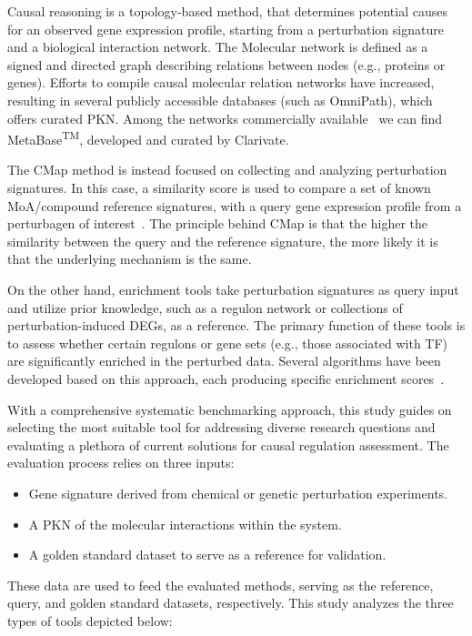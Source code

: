 Causal reasoning is a topology-based method, that determines potential causes for an observed gene expression profile, starting from a perturbation signature and a biological interaction network. 
The \gls{Molecular network} is defined as a signed and directed graph describing relations between nodes (e.g., proteins or genes). 
Efforts to compile causal molecular relation networks have increased, resulting in several publicly accessible databases (such as OmniPath), which offers curated \gls{PKN}. 
Among the networks commercially available~\cite{RN32} we can find MetaBase\textsuperscript{TM}, developed and curated by Clarivate.

The \gls{CMap} method is instead focused on collecting and analyzing perturbation signatures. 
In this case, a similarity score is used to compare a set of known \gls{MoA}/compound reference signatures, with a query gene expression profile from a perturbagen of interest~\cite{RN34, RN31}.
The principle behind \gls{CMap} is that the higher the similarity between the query and the reference signature, the more likely it is that the underlying mechanism is the same. 

On the other hand, enrichment tools take perturbation signatures as query input and utilize prior knowledge, such as a regulon network or collections of perturbation-induced \gls{DEGs}, as a reference. 
The primary function of these tools is to assess whether certain regulons or gene sets (e.g., those associated with \gls{TF}) are significantly enriched in the perturbed data. 
Several algorithms have been developed based on this approach, each producing specific enrichment scores~\cite{RN35}.

With a comprehensive systematic benchmarking approach, this study guides on selecting the most suitable tool for addressing diverse research questions and evaluating a plethora of current solutions for causal regulation assessment. 
The evaluation process relies on three inputs:

\begin{itemize}
  \item \gls{Gene signature} derived from chemical or genetic perturbation experiments.
  \item A \gls{PKN} of the molecular interactions within the system. 
  \item A golden standard dataset to serve as a reference for validation.
\end{itemize}

These data are used to feed the evaluated methods, serving as the reference, query, and golden standard datasets, respectively. 
This study analyzes the three types of tools depicted below: 

